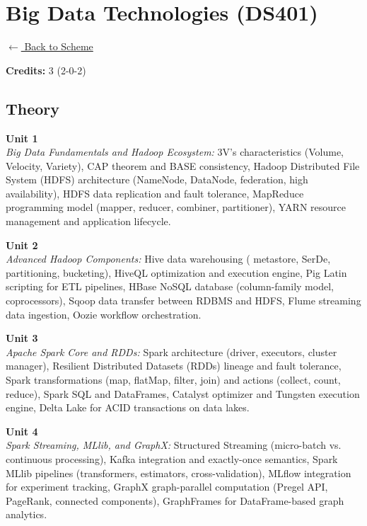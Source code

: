 \section*{Big Data Technologies (DS401)}
\label{major:DS_4}

\noindent \small{\hyperref[main:scheme]{$\leftarrow$ Back to Scheme}} \vspace{0.5cm}

\noindent \textbf{Credits:} 3 (2-0-2)

\subsection*{Theory}
\noindent\textbf{Unit 1} \\
\textit{Big Data Fundamentals and Hadoop Ecosystem:} 3V's characteristics (Volume, Velocity, Variety), CAP theorem and BASE consistency, Hadoop Distributed File System (HDFS) architecture (NameNode, DataNode, federation, high availability), HDFS data replication and fault tolerance, MapReduce programming model (mapper, reducer, combiner, partitioner), YARN resource management and application lifecycle.

\vspace{0.3cm}

\noindent\textbf{Unit 2} \\
\textit{Advanced Hadoop Components:} Hive data warehousing ( metastore, SerDe, partitioning, bucketing), HiveQL optimization and execution engine, Pig Latin scripting for ETL pipelines, HBase NoSQL database (column-family model, coprocessors), Sqoop data transfer between RDBMS and HDFS, Flume streaming data ingestion, Oozie workflow orchestration.

\vspace{0.3cm}

\noindent\textbf{Unit 3} \\
\textit{Apache Spark Core and RDDs:} Spark architecture (driver, executors, cluster manager), Resilient Distributed Datasets (RDDs) lineage and fault tolerance, Spark transformations (map, flatMap, filter, join) and actions (collect, count, reduce), Spark SQL and DataFrames, Catalyst optimizer and Tungsten execution engine, Delta Lake for ACID transactions on data lakes.

\vspace{0.3cm}

\noindent\textbf{Unit 4} \\
\textit{Spark Streaming, MLlib, and GraphX:} Structured Streaming (micro-batch vs. continuous processing), Kafka integration and exactly-once semantics, Spark MLlib pipelines (transformers, estimators, cross-validation), MLflow integration for experiment tracking, GraphX graph-parallel computation (Pregel API, PageRank, connected components), GraphFrames for DataFrame-based graph analytics.

